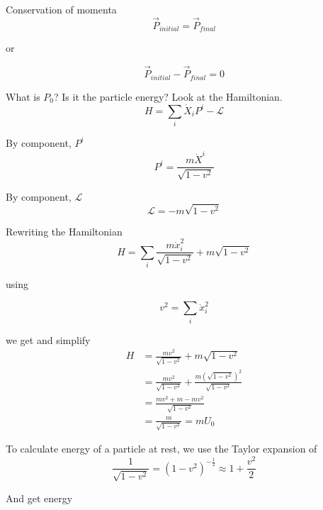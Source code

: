 \documentclass{article}
\begin{document}
Conservation of momenta
\begin{equation}
\vec P_{initial} = \vec P_{final}
\end{equation}

or

\begin{equation}
\vec P_{initial} - \vec P_{final} = 0
\end{equation}

What is $P_0$?  Is it the particle energy?  Look at the Hamiltonian.
\begin{equation}
H = \sum_i{\dot X_i P^i - \mathscr{L}}
\end{equation}

By component, $P^i$
\begin{equation}
P^i = \frac{m \dot X^{i}}{\sqrt{1 - v^2}}
\end{equation}

By component, $\mathscr{L}$
\begin{equation}
\mathscr{L} = -m \sqrt{1 - v^{2}}
\end{equation}

Rewriting the Hamiltonian
\begin{equation}
H = \sum_i \frac{m \dot x_{i}^{2}}{\sqrt{1 - v^2}} + m \sqrt{1-v^2}
\end{equation}

using

\begin{equation}
v^2 = \sum_i \dot x_{i}^{2}
\end{equation}

we get and simplify
\begin{equation}
\begin{split}
H &=\frac{m v^2}{\sqrt{1 - v^2}} + m \sqrt{1-v^2} \\
&=\frac{m v^2}{\sqrt{1 - v^2}} + \frac{m \left( \sqrt{1-v^2} \right)^2}{\sqrt{1-v^2}}\\
&=\frac{m v^2 + m - m v^2}{\sqrt{1-v^2}}\\
&=\frac{m}{\sqrt{1-v^2}} = m U_0
\end{split}
\end{equation}

To calculate energy of a particle at rest, we use the Taylor expansion of
\begin{equation}
\frac{1}{\sqrt{1 - v^2}} = \left( 1 - v^2 \right)^{-\frac{1}{2}} \approx 1 + \frac{v^2}{2}
\end{equation}

And get energy
\end{document}
